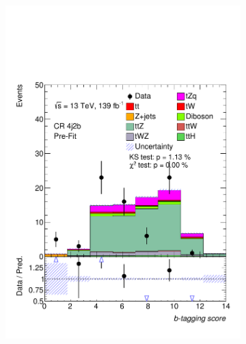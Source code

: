\begin{figure}[!h]
\begin{subfigure}[b]{0.33\linewidth}
    \includegraphics[width=\linewidth]{ubonn-thesis/Chapters/Chapters_06/Figure/Input_distribution/CR_4j2b_btag.pdf} 
  \end{subfigure}
  \centering
  \begin{subfigure}[b]{0.33\linewidth}
    \centering

\end{subfigure}
\end{figure}
